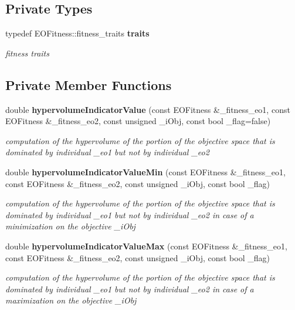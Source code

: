 \subsection*{Private Types}
\begin{CompactItemize}
\item 
typedef EOFitness::fitness\_\-traits {\bf traits}\label{classmoeoBinaryHypervolumeIndicator_511931936ec9e368b5f0cbcdc4dbe020}

\begin{CompactList}\small\item\em fitness traits \item\end{CompactList}\end{CompactItemize}
\subsection*{Private Member Functions}
\begin{CompactItemize}
\item 
double {\bf hypervolume\-Indicator\-Value} (const EOFitness \&\_\-fitness\_\-eo1, const EOFitness \&\_\-fitness\_\-eo2, const unsigned \_\-i\-Obj, const bool \_\-flag=false)
\begin{CompactList}\small\item\em computation of the hypervolume of the portion of the objective space that is dominated by individual \_\-eo1 but not by individual \_\-eo2 \item\end{CompactList}\item 
double {\bf hypervolume\-Indicator\-Value\-Min} (const EOFitness \&\_\-fitness\_\-eo1, const EOFitness \&\_\-fitness\_\-eo2, const unsigned \_\-i\-Obj, const bool \_\-flag)
\begin{CompactList}\small\item\em computation of the hypervolume of the portion of the objective space that is dominated by individual \_\-eo1 but not by individual \_\-eo2 in case of a minimization on the objective \_\-i\-Obj \item\end{CompactList}\item 
double {\bf hypervolume\-Indicator\-Value\-Max} (const EOFitness \&\_\-fitness\_\-eo1, const EOFitness \&\_\-fitness\_\-eo2, const unsigned \_\-i\-Obj, const bool \_\-flag)
\begin{CompactList}\small\item\em computation of the hypervolume of the portion of the objective space that is dominated by individual \_\-eo1 but not by individual \_\-eo2 in case of a maximization on the objective \_\-i\-Obj \item\end{CompactList}\end{CompactItemize}
